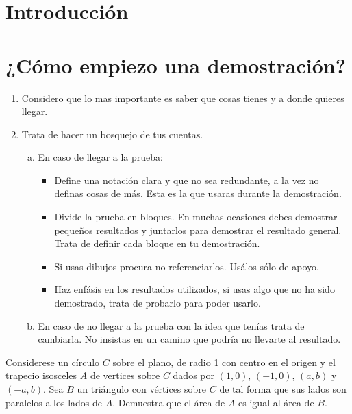 \documentclass[a4paper,openright,10pt]{book}
\numberwithin{equation}{section}
\theoremstyle{definition}
\theoremstyle{definition}
\begin{document}
\tableofcontents %
\chapter*{Introducción}\label{cap.introduccion}

\chapter*{¿Cómo empiezo una demostración?}

\begin{itemize}
\begin{enumerate}
\item Considero que lo mas importante es saber que cosas tienes y a donde quieres llegar. 
\item Trata de hacer un bosquejo de tus cuentas.

\begin{enumerate}[a)]
\item En caso de llegar a la prueba:

\begin{itemize}
\item  Define una notación clara y que no sea redundante, a la vez no definas cosas de más. Esta es la que usaras durante la demostración.   

\item Divide la prueba en bloques. En muchas ocasiones debes demostrar pequeños resultados y juntarlos para demostrar el resultado general. Trata de definir cada bloque en tu demostración.

\item Si usas dibujos procura no referenciarlos. Usálos sólo de apoyo.  

\item Haz enfásis en los resultados utilizados, si usas algo que no ha sido demostrado, trata de probarlo para poder usarlo.
\end{itemize}

\item En caso de no llegar a la prueba con la idea que tenías trata de cambiarla. No insistas en un camino que podría no llevarte al resultado.
\end{enumerate}

\end{enumerate}
\begin{ejm}
Considerese un círculo $C$ sobre el plano, de radio 1 con centro en el origen y el trapecio isosceles $A$ de vertices sobre $C$ dados por $(1,0)$, $(-1,0)$, $(a,b)$ y $(-a,b)$. Sea $B$ un triángulo con vértices sobre $C$ de tal forma que sus lados son paralelos a los lados de $A$. Demuestra que el área de $A$ es igual al área de $B.$


\end{ejm}
\end{itemize}
\end{document}

